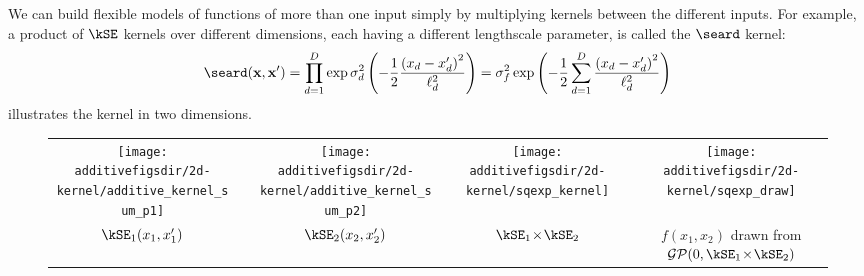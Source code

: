 We can build flexible models of functions of more than one input simply by multiplying kernels between the different inputs.
For example, a product of $\kSE$ kernels over different dimensions, each having a different lengthscale parameter, is called the $\seard$ kernel:
%
\begin{align}
\seard( \vx, \vx')
 = \prod_{d=1}^D \exp \sigma_d^2 \left( -\frac{1}{2} \frac{\left( x_d - x'_d \right)^2}{\ell_d^2} \right)
 = \sigma_f^2 \exp \left( -\frac{1}{2} \sum_{d=1}^D \frac{\left( x_d - x'_d \right)^2}{\ell_d^2} \right)
\end{align}
%
 illustrates the \seard{} kernel in two dimensions.
%
\begin{figure}[ht!]
\centering
\begin{tabular}{ccccccc}
\texttt{[image: \\additivefigsdir/2d-kernel/additive\_kernel\_sum\_p1]} \hspace{-0.3cm}
& \hspace{-0.3cm} \raisebox{1cm}{$\times$} & 
\hspace{-0.3cm}\texttt{[image: \\additivefigsdir/2d-kernel/additive\_kernel\_sum\_p2]} \hspace{-0.3cm}
& \hspace{-0.2cm} \raisebox{1cm}{=} \hspace{-0.2cm} & \hspace{-0.3cm}
\texttt{[image: \\additivefigsdir/2d-kernel/sqexp\_kernel]} 
& \hspace{-0.3cm} \raisebox{1cm}{$\rightarrow$} \hspace{-0.3cm} & \hspace{-0.3cm}
\texttt{[image: \\additivefigsdir/2d-kernel/sqexp\_draw]}\\
$\kSE_1(x_1, x_1')$ &  & $\kSE_2(x_2, x_2')$ &  & \hspace{-0.4cm} $\kSE_1 \kerntimes \kSE_2$ & & \hspace{-0.5cm} \parbox{0.24\columnwidth}{$f(x_1, x_2)$ drawn from $\GPt{0}{\kSE_1 \kerntimes \kSE_2}$} \\

\end{tabular}
\end{figure}
